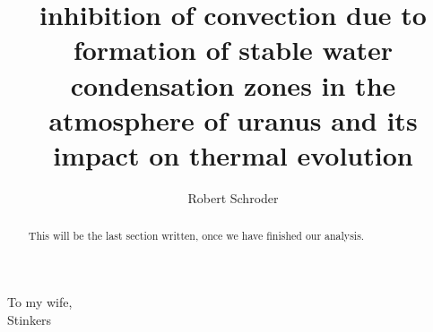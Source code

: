 \documentclass[11pt]{ucscthesisbs}
\begin{document}

\title{inhibition of convection due to formation of stable water condensation zones in the atmosphere of uranus and its impact on thermal evolution}
\author{Robert Schroder}
%
%



\maketitle
\copyrightpage

\begin{frontmatter}

\begin{abstract}
This will be the last section written, once we have finished our analysis.
\end{abstract}

\tableofcontents
%
%
\listoffigures
\listoftables

\begin{dedication}
\null\vfil
{\large
\begin{center}
To my wife,\\\vspace{12pt}
Stinkers
\end{center}}
\vfil\null
\end{dedication}

\begin{acknowledgements}

\end{acknowledgements}


\end{frontmatter}

\end{document}
